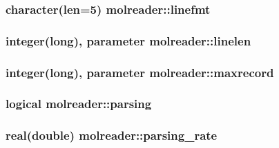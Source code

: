 \hypertarget{classmolreader_ac14650c697f68fd15530b93807e3f42f}{
\subsubsection[{linefmt}]{\setlength{\rightskip}{0pt plus 5cm}character(len=5) molreader\+::linefmt\hspace{0.3cm}{\ttfamily [private]}}}\label{classmolreader_ac14650c697f68fd15530b93807e3f42f}
\hypertarget{classmolreader_acd493d996a1fcd0ed77937e925c9b7fe}{
\subsubsection[{linelen}]{\setlength{\rightskip}{0pt plus 5cm}integer(long), parameter molreader\+::linelen\hspace{0.3cm}{\ttfamily [private]}}}\label{classmolreader_acd493d996a1fcd0ed77937e925c9b7fe}
\hypertarget{classmolreader_a7192fdfba4bcb0ee7504a9c6695c7106}{
\subsubsection[{maxrecord}]{\setlength{\rightskip}{0pt plus 5cm}integer(long), parameter molreader\+::maxrecord\hspace{0.3cm}{\ttfamily [private]}}}\label{classmolreader_a7192fdfba4bcb0ee7504a9c6695c7106}
\hypertarget{classmolreader_a151a8b8c33b86ab86d352aeaaf9ec84b}{
\subsubsection[{parsing}]{\setlength{\rightskip}{0pt plus 5cm}logical molreader\+::parsing\hspace{0.3cm}{\ttfamily [private]}}}\label{classmolreader_a151a8b8c33b86ab86d352aeaaf9ec84b}
\hypertarget{classmolreader_a5cf7dc5ccdeb068704a693ec6b248796}{
\subsubsection[{parsing\+\_\+rate}]{\setlength{\rightskip}{0pt plus 5cm}real(double) molreader\+::parsing\+\_\+rate\hspace{0.3cm}{\ttfamily [private]}}}\label{classmolreader_a5cf7dc5ccdeb068704a693ec6b248796}
